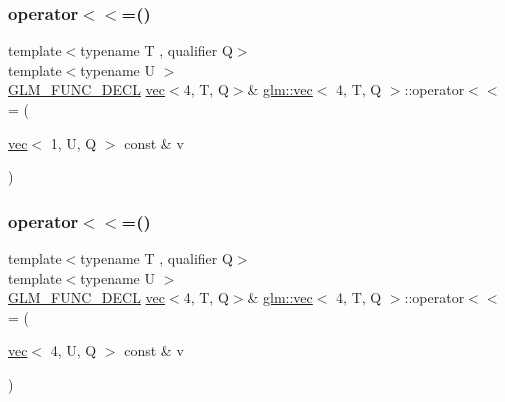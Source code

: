 \subsubsection{\texorpdfstring{operator$<$$<$=()}{operator<<=()}\hspace{0.1cm}{\footnotesize\ttfamily [2/6]}}
{\footnotesize\ttfamily template$<$typename T , qualifier Q$>$ \\
template$<$typename U $>$ \\
\mbox{\hyperlink{setup_8hpp_ab2d052de21a70539923e9bcbf6e83a51}{G\+L\+M\+\_\+\+F\+U\+N\+C\+\_\+\+D\+E\+CL}} \mbox{\hyperlink{structglm_1_1vec}{vec}}$<$4, T, Q$>$\& \mbox{\hyperlink{structglm_1_1vec}{glm\+::vec}}$<$ 4, T, Q $>$\+::operator$<$$<$= (\begin{DoxyParamCaption}\item[{\mbox{\hyperlink{structglm_1_1vec}{vec}}$<$ 1, U, Q $>$ const \&}]{v }\end{DoxyParamCaption})}

\mbox{\label{structglm_1_1vec_3_014_00_01_t_00_01_q_01_4_aee9c69807b9f783f5b6801f86fe153d7}} 
\subsubsection{\texorpdfstring{operator$<$$<$=()}{operator<<=()}\hspace{0.1cm}{\footnotesize\ttfamily [3/6]}}
{\footnotesize\ttfamily template$<$typename T , qualifier Q$>$ \\
template$<$typename U $>$ \\
\mbox{\hyperlink{setup_8hpp_ab2d052de21a70539923e9bcbf6e83a51}{G\+L\+M\+\_\+\+F\+U\+N\+C\+\_\+\+D\+E\+CL}} \mbox{\hyperlink{structglm_1_1vec}{vec}}$<$4, T, Q$>$\& \mbox{\hyperlink{structglm_1_1vec}{glm\+::vec}}$<$ 4, T, Q $>$\+::operator$<$$<$= (\begin{DoxyParamCaption}\item[{\mbox{\hyperlink{structglm_1_1vec}{vec}}$<$ 4, U, Q $>$ const \&}]{v }\end{DoxyParamCaption})}

\mbox{\label{structglm_1_1vec_3_014_00_01_t_00_01_q_01_4_a2f063a4fd07698015d81f2a66023e021}} 
